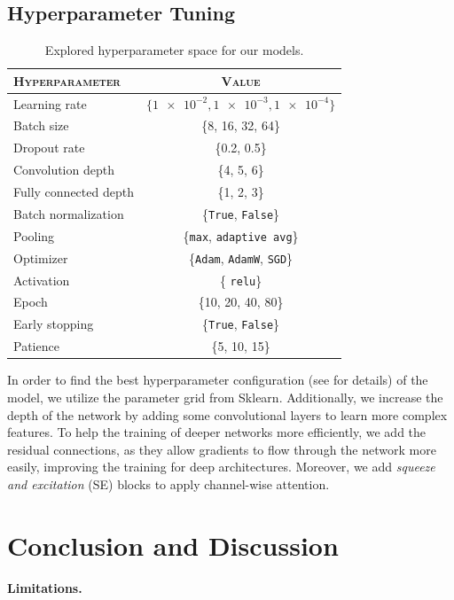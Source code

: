 \subsection{Hyperparameter Tuning}
\label{sec:optim:tuning}

\begin{table}[ht]
  \centering
  \begin{tabular}{@{}lc@{}}
    \toprule
    \textsc{Hyperparameter} & \textsc{Value} \\
    \midrule
    Learning rate & $ \{\num{1e-2}, \num{1e-3}, \num{1e-4} \} $ \\
    Batch size & \{8, 16, 32, 64\} \\
    Dropout rate & \{0.2, 0.5\} \\
    Convolution depth & \{4, 5, 6\} \\
    Fully connected depth & \{1, 2, 3\} \\
    Batch normalization & \{\texttt{True}, \texttt{False}\} \\
    Pooling & \{\texttt{max}, \texttt{adaptive avg}\} \\
    Optimizer & \{\texttt{Adam}, \texttt{AdamW}, \texttt{SGD}\} \\
    Activation & \{ \texttt{relu}\} \\ %
    Epoch & \{10, 20, 40, 80\} \\
    Early stopping & \{\texttt{True}, \texttt{False}\} \\
    Patience & \{5, 10, 15\} \\
    \bottomrule
  \end{tabular}
  \caption{Explored hyperparameter space for our models.}
  \label{tab:hyper}
\end{table}

In order to find the best hyperparameter configuration (see  for details) of the model, 
we utilize the parameter grid from Sklearn.
Additionally, 
we increase the depth of the network by adding some convolutional layers to learn more complex features. 
To help the training of deeper networks more efficiently, 
we add the residual connections, 
as they allow gradients to flow through the network more easily, 
improving the training for deep architectures. 
Moreover, 
we add \textit{squeeze and excitation} (SE) blocks to apply channel-wise attention. 

\section{Conclusion and Discussion}
\label{sec:conclusion}

\paragraph{Limitations.}

\newpage
